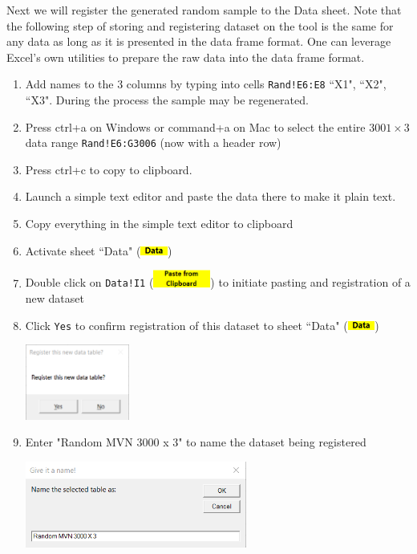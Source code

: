 \documentclass[article]{jss}
\numberwithin{equation}{subsection}
\newcommand{\shtData}{``Data" (\includegraphics[height=8pt, keepaspectratio=true]{img/DataSheetTab_png}) }
\begin{document}
        Next we will register the generated random sample to the Data sheet. Note that the following step of storing and registering dataset on the tool is the same for any data as long as it is presented in the data frame format. One can leverage Excel's own utilities to prepare the raw data into the data frame format.
        \begin{enumerate}
        \item Add names to the 3 columns by typing into cells \texttt{Rand!E6:E8} ``X1", ``X2", ``X3". During the process the sample may be regenerated.
        \item Press ctrl+a on Windows or command+a on Mac to select the entire $3001\times 3$ data range \texttt{Rand!E6:G3006} (now with a header row)
        \item Press ctrl+c to copy to clipboard.
        \item Launch a simple text editor and paste the data there to make it plain text.
        \item Copy everything in the simple text editor to clipboard
        \item Activate sheet \shtData
        \item Double click on \texttt{Data!I1} (\includegraphics[height=16pt,keepaspectratio=true]{img/DataSheet_PasteFromClipboardButton_png}) to initiate pasting and registration of a new dataset
        \item Click \texttt{Yes} to confirm registration of this dataset to sheet \shtData
        \begin{center}
	        \vspace{-10pt}\includegraphics[height=70pt, keepaspectratio=true]{img/DataSheet_ConfirmRegister_png}\vspace{-10pt}
        \end{center}
        \item Enter "Random MVN 3000 x 3" to name the dataset being registered
        \begin{center}
	        \vspace{-10pt}\includegraphics[height=80pt, keepaspectratio=true]{img/DataSheet_GiveDatasetName_png}\vspace{-10pt}

\end{center}
\end{enumerate}
\end{document}
